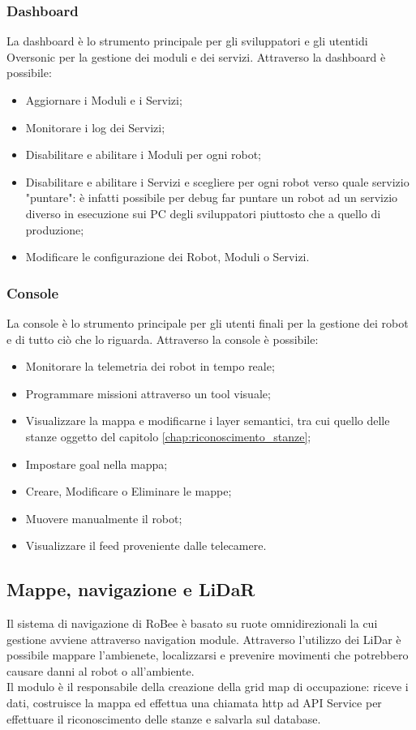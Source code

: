 \subsubsection{Dashboard}
La dashboard è lo strumento principale per gli sviluppatori e gli utentidi Oversonic per la gestione dei moduli e dei servizi. Attraverso la dashboard è possibile:
\begin{itemize}
  \item Aggiornare i Moduli e i Servizi;
  \item Monitorare i log dei Servizi;
  \item Disabilitare e abilitare i Moduli per ogni robot;
  \item Disabilitare e abilitare i Servizi e scegliere per ogni robot verso quale servizio "puntare": è infatti possibile per debug far puntare un robot ad un servizio diverso in esecuzione sui PC degli sviluppatori piuttosto che a quello di produzione;
  \item Modificare le configurazione dei Robot, Moduli o Servizi.
\end{itemize}
\subsubsection{Console}
La console è lo strumento principale per gli utenti finali per la gestione dei robot e di tutto ciò che lo riguarda. Attraverso la console è possibile:
\begin{itemize}
  \item Monitorare la telemetria dei robot in tempo reale;
  \item Programmare missioni attraverso un tool visuale;
  \item Visualizzare la mappa e modificarne i layer semantici, tra cui quello delle stanze oggetto del capitolo \ref{chap:riconoscimento_stanze};
  \item Impostare goal nella mappa;
  \item Creare, Modificare o Eliminare le mappe;
  \item Muovere manualmente il robot;
  \item Visualizzare il feed proveniente dalle telecamere.
\end{itemize}

\subsection{Mappe, navigazione e LiDaR}
Il sistema di navigazione di RoBee è basato su ruote omnidirezionali la cui gestione avviene attraverso navigation module. Attraverso l'utilizzo dei LiDar è possibile mappare l'ambienete, localizzarsi e prevenire movimenti che potrebbero causare danni al robot o all'ambiente.\\
Il modulo è il responsabile della creazione della grid map di occupazione: riceve i dati, costruisce la mappa ed effettua una chiamata http ad API Service per effettuare il riconoscimento delle stanze e salvarla sul database.

